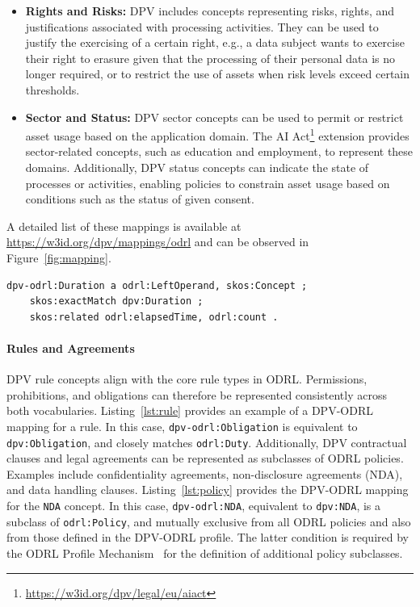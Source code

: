 \begin{itemize}
    \item \textbf{Rights and Risks:} DPV includes concepts representing risks, rights, and justifications associated with processing activities. They can be used to justify the exercising of a certain right, e.g., a data subject wants to exercise their right to erasure given that the processing of their personal data is no longer required, or to restrict the use of assets when risk levels exceed certain thresholds.
    \item \textbf{Sector and Status:} DPV sector concepts can be used to permit or restrict asset usage based on the application domain. The AI Act\footnote{\url{https://w3id.org/dpv/legal/eu/aiact}} extension provides sector-related concepts, such as education and employment, to represent these domains. Additionally, DPV status concepts can indicate the state of processes or activities, enabling policies to constrain asset usage based on conditions such as the status of given consent.
\end{itemize}
A detailed list of these mappings
is available at \url{https://w3id.org/dpv/mappings/odrl}
and can be observed in Figure~\ref{fig:mapping}.

\begin{scriptsize}
\begin{lstlisting}[language=turtle, caption=DPV-ODRL mapping for the Duration concept.,  label=lst:duration]
dpv-odrl:Duration a odrl:LeftOperand, skos:Concept ;
    skos:exactMatch dpv:Duration ;
    skos:related odrl:elapsedTime, odrl:count .
\end{lstlisting}
\end{scriptsize}

\paragraph{Rules and Agreements}

DPV rule concepts align with the core rule types in ODRL.
Permissions, prohibitions, and obligations
can therefore be represented consistently across both vocabularies.
Listing~\ref{lst:rule} provides an example of a
DPV-ODRL mapping for a rule.
In this case,
\texttt{dpv-odrl:Obligation} is equivalent to \texttt{dpv:Obligation},
and closely matches \texttt{odrl:Duty}.
Additionally,
DPV contractual clauses and legal agreements
can be represented as subclasses of ODRL policies.
Examples include confidentiality agreements, 
non-disclosure agreements (NDA), and data handling clauses.
Listing~\ref{lst:policy} provides
the DPV-ODRL mapping for the \texttt{NDA} concept.
In this case,
\texttt{dpv-odrl:NDA},
equivalent to \texttt{dpv:NDA},
is a subclass of \texttt{odrl:Policy},
and mutually exclusive from all ODRL policies and
also from those defined in the DPV-ODRL profile.
The latter condition is required by the 
ODRL Profile Mechanism~\cite{steidl_odrl_2023}
for the definition of additional policy subclasses.

